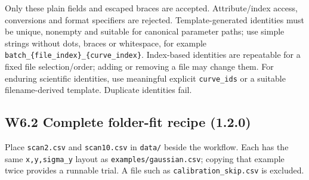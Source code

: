 \documentclass[
  10pt,
  a4paper,
  oneside]{scrreprt}
\begin{document}
Only these plain fields and escaped braces are accepted. Attribute/index
access, conversions and format specifiers are rejected.
Template-generated identities must be unique, nonempty and suitable for
canonical parameter paths; use simple strings without dots, braces or
whitespace, for example
\texttt{batch\_\{file\_index\}\_\{curve\_index\}}. Index-based
identities are repeatable for a fixed file selection/order; adding or
removing a file may change them. For enduring scientific identities, use
meaningful explicit \texttt{curve\_ids} or a suitable filename-derived
template. Duplicate identities fail.

\hypertarget{w6.2-complete-folder-fit-recipe-1.2.0}{%
\subsection{W6.2 Complete folder-fit recipe
(1.2.0)}\label{w6.2-complete-folder-fit-recipe-1.2.0}}

Place \texttt{scan2.csv} and \texttt{scan10.csv} in \texttt{data/}
beside the workflow. Each has the same \texttt{x,y,sigma\_y} layout as
\texttt{examples/gaussian.csv}; copying that example twice provides a
runnable trial. A file such as \texttt{calibration\_skip.csv} is
excluded.
\end{document}
